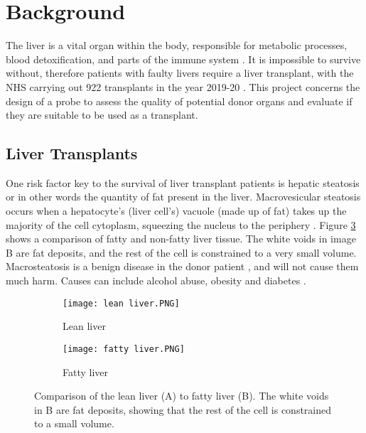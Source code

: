 \section{Background}

The liver is a vital organ within the body, responsible for metabolic processes, blood detoxification, and parts of the immune system \cite{liver_background}. It is impossible to survive without, therefore patients with faulty livers require a liver transplant, with the NHS carrying out 922 transplants in the year 2019-20 \cite{nhs_transplants}. This project concerns the design of a probe to assess the quality of potential donor organs and evaluate if they are suitable to be used as a transplant.


\subsection{Liver Transplants}
One risk factor key to the survival of liver transplant patients is hepatic steatosis or in other words the quantity of fat present in the liver. Macrovesicular steatosis occurs when a hepatocyte’s (liver cell’s) vacuole (made up of fat) takes up the majority of the cell cytoplasm, squeezing the nucleus to the periphery \cite{Imber2002}. Figure \ref{fig: livers} shows a comparison of fatty and non-fatty liver tissue. The white voids in image B are fat deposits, and the rest of the cell is constrained to a very small volume. Macrosteatosis is a benign disease in the donor patient \cite{Imber2002}, and will not cause them much harm. Causes can include alcohol abuse, obesity and diabetes \cite{Imber2002}.\\

\begin{figure}[htbp]
	\centering
	\begin{subfigure}[b]{0.4\linewidth}
		\texttt{[image: lean liver.PNG]}
		\caption{Lean liver \cite{Bruno2008}}
		\label{}
	\end{subfigure}
	\begin{subfigure}[b]{0.4\linewidth}
		\texttt{[image: fatty liver.PNG]}
		\caption{Fatty liver \cite{Bruno2008}}
		\label{}
	\end{subfigure}
	\caption{Comparison of the lean liver (A) to fatty liver (B). The white voids in B are fat deposits, showing that the rest of the cell is constrained to a small volume.}
	\label{fig: livers}
\end{figure}	



